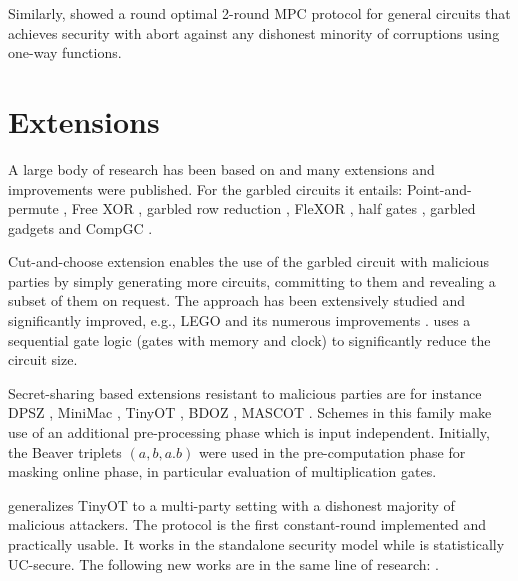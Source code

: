 \documentclass[
  digital, %
  twoside, %
  table,   %
  lof,     %
  lot,     %
]{fithesis3}
\theoremstyle{definition}
\theoremstyle{remark}
\begin{document}
Similarly, \cite{cryptoeprint:2018:572} showed a round optimal 2-round MPC protocol for general circuits that achieves security with abort against any dishonest minority of corruptions using one-way functions.

\section{Extensions}\label{sec:soa:extensions}%
A large body of research has been based on \cite{Yao86, GMW87, BGW88, CCD88} and many extensions and improvements were published. 
For the garbled circuits it entails: Point-and-permute \cite{BMR90}, Free XOR \cite{KS08}, garbled row reduction \cite{NPS99, PSSW09}, FleXOR \cite{KMR14}, half gates \cite{ZRE14}, garbled gadgets \cite{BMR16} and CompGC \cite{cryptoeprint:2016:458}.

Cut-and-choose extension \cite{LP07,LP11,Lin16} enables the use of the garbled circuit with malicious parties by simply generating more circuits, committing to them and revealing a subset of them on request. The approach has been extensively studied and significantly improved, e.g., LEGO \cite{NO09} and its numerous improvements \cite{cryptoeprint:2013:155, FJNT15, cryptoeprint:2016:1069, cryptoeprint:2017:226, KNBTR17, cryptoeprint:2018:578}.
\cite{SHSSK15} uses a sequential gate logic (gates with memory and clock) to significantly reduce the circuit size. %

Secret-sharing based extensions resistant to malicious parties are for instance DPSZ \cite{DPSZ12, cryptoeprint:2012:642}, MiniMac \cite{DZ13}, TinyOT \cite{NNOB12}, BDOZ \cite{BDOZ11}, MASCOT \cite{KOS16}. Schemes in this family make use of an additional pre-processing phase which is input independent. Initially, the Beaver triplets \cite{B91a} $(a,b,a.b)$ were used in the pre-computation phase for masking online phase, in particular evaluation of multiplication gates.

\cite{WRK17} generalizes TinyOT to a multi-party setting with a dishonest majority of malicious attackers. The protocol is the first constant-round implemented and practically usable. It works in the standalone security model while \cite{DPSZ12} is statistically UC-secure. The following new works are in the same line of research: \cite{FKOS15, DZ16, LPJ17, BCGIM17, cryptoeprint:2017:1230}.
%
\end{document}
